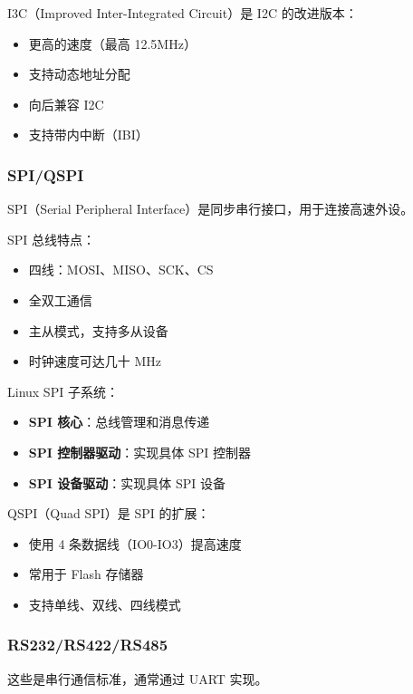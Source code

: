 I3C（Improved Inter-Integrated Circuit）是 I2C 的改进版本：
\begin{itemize}
  \item 更高的速度（最高 12.5MHz）
  \item 支持动态地址分配
  \item 向后兼容 I2C
  \item 支持带内中断（IBI）
\end{itemize}

\subsubsection{SPI/QSPI}

SPI（Serial Peripheral Interface）是同步串行接口，用于连接高速外设。

SPI 总线特点：
\begin{itemize}
  \item 四线：MOSI、MISO、SCK、CS
  \item 全双工通信
  \item 主从模式，支持多从设备
  \item 时钟速度可达几十 MHz
\end{itemize}

Linux SPI 子系统：
\begin{itemize}
  \item \textbf{SPI 核心}：总线管理和消息传递
  \item \textbf{SPI 控制器驱动}：实现具体 SPI 控制器
  \item \textbf{SPI 设备驱动}：实现具体 SPI 设备
\end{itemize}

QSPI（Quad SPI）是 SPI 的扩展：
\begin{itemize}
  \item 使用 4 条数据线（IO0-IO3）提高速度
  \item 常用于 Flash 存储器
  \item 支持单线、双线、四线模式
\end{itemize}

\subsubsection{RS232/RS422/RS485}

这些是串行通信标准，通常通过 UART 实现。

